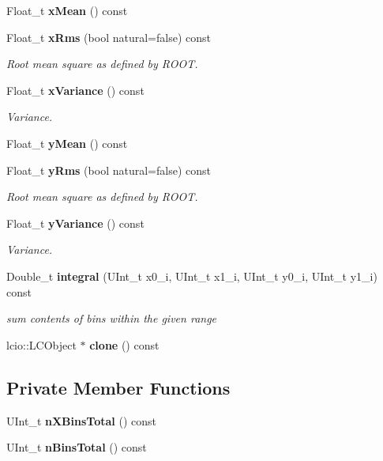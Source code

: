 \begin{DoxyCompactItemize}
\item 
Float\_\-t {\bfseries xMean} () const \label{classhistmgr_1_1FloatHistogram2D_a7942a45e5b0dd5e353a0d58b62b8de5c}

\item 
Float\_\-t {\bf xRms} (bool natural=false) const 
\begin{DoxyCompactList}\small\item\em Root mean square as defined by ROOT. \item\end{DoxyCompactList}\item 
Float\_\-t {\bf xVariance} () const 
\begin{DoxyCompactList}\small\item\em Variance. \item\end{DoxyCompactList}\item 
Float\_\-t {\bfseries yMean} () const \label{classhistmgr_1_1FloatHistogram2D_a10414e7c9ad34612626fd74572f8add9}

\item 
Float\_\-t {\bf yRms} (bool natural=false) const 
\begin{DoxyCompactList}\small\item\em Root mean square as defined by ROOT. \item\end{DoxyCompactList}\item 
Float\_\-t {\bf yVariance} () const 
\begin{DoxyCompactList}\small\item\em Variance. \item\end{DoxyCompactList}\item 
Double\_\-t {\bf integral} (UInt\_\-t x0\_\-i, UInt\_\-t x1\_\-i, UInt\_\-t y0\_\-i, UInt\_\-t y1\_\-i) const 
\begin{DoxyCompactList}\small\item\em sum contents of bins within the given range \item\end{DoxyCompactList}\item 
lcio::LCObject $\ast$ {\bfseries clone} () const \label{classhistmgr_1_1FloatHistogram2D_a3d2ff7763edb2ad062006f7170a32285}

\end{DoxyCompactItemize}
\subsection*{Private Member Functions}
\begin{DoxyCompactItemize}
\item 
UInt\_\-t {\bfseries nXBinsTotal} () const \label{classhistmgr_1_1FloatHistogram2D_af5a817d2d34a4ee5ecde6dc84b4d5996}

\item 
UInt\_\-t {\bfseries nBinsTotal} () const \label{classhistmgr_1_1FloatHistogram2D_a378ba87874ae6a6d6a2eefc558d3bb7e}

\end{DoxyCompactItemize}


